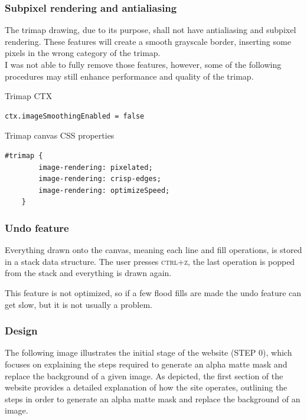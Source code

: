 \documentclass[a4paper]{article}
\begin{document}
\pagebreak

\subsubsection{Subpixel rendering and antialiasing}

The trimap drawing, due to its purpose, shall not have antialiasing
and subpixel rendering. These features will create a smooth grayscale border,
inserting some pixels in the wrong category of the trimap. \\

I was not able to fully remove those features, however, some of the following
procedures may still enhance performance and quality of the trimap.

{\color{gray}Trimap CTX}
\begin{lstlisting}[style=JS, style=boxed]
    ctx.imageSmoothingEnabled = false
\end{lstlisting}

Trimap canvas CSS properties
\begin{lstlisting}[style=JS, style=boxed]
    #trimap {
        image-rendering: pixelated;
        image-rendering: crisp-edges;
        image-rendering: optimizeSpeed;
    }
\end{lstlisting}

\subsubsection{Undo feature}

Everything drawn onto the canvas, meaning each line and fill operations,
is stored in a stack data structure.
The user presses \textsc{ctrl+z}, the last operation
is popped from the stack and everything is drawn again.

This feature is not optimized, so if a few flood fills are
made the undo feature can get slow, but it is not usually a problem.

\pagebreak

\subsubsection{Design}

The following image illustrates the initial stage of the
website (\textsc{STEP 0}),
which focuses on explaining the steps required to generate an
alpha matte mask and replace the background of a given image.
As depicted, the first section of the website provides a detailed
explanation of how the site operates,
outlining the steps in order to generate an alpha matte
mask and replace the background of an image.
\end{document}
